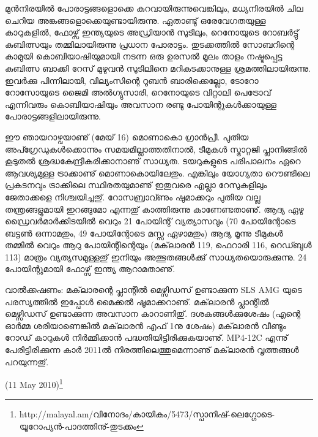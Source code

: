 മുന്‍നിരയില്‍ പോരാട്ടങ്ങളൊക്കെ കുറവായിരുന്നുവെങ്കിലും, മധ്യനിരയില്‍ ചില ചെറിയ അങ്കങ്ങളൊക്കെയുണ്ടായിരുന്നു.
ഏതാണ്ടു് ഒരേവേഗതയുള്ള കാറുകളില്‍, ഫോഴ്സ് ഇന്ത്യയുടെ അഡ്രിയാന്‍ സുടിലും, റെനോയുടെ റോബര്‍ട്ടു് കുബിത്സയും 
തമ്മിലായിരുന്നു പ്രധാന പോരാട്ടം. തുടക്കത്തില്‍ സോബറിന്റെ കാമുയി കൊബിയാഷിയുമായി നടന്ന ഒരു ഉരസല്‍ മൂലം 
താളം നഷ്ടപ്പെട്ട കുബിത്സ ബാക്കി റേസ് മുഴുവന്‍ സുടിലിനെ മറികടക്കാനുള്ള ശ്രമത്തിലായിരുന്നു. ഇവര്‍ക്കു പിന്നിലായി, 
വില്യംസിന്റെ റൂബന്‍ ബാരിക്കെല്ലോ, ടോറോ റോസോയുടെ ജൈമി അല്‍ഗ്യുസാരി, റെനോയുടെ വിറ്റാലി പെട്രോവ് 
എന്നിവരും കൊബിയാഷിയും അവസാന രണ്ടു പോയിന്റുകള്‍ക്കായുള്ള പോരാട്ടങ്ങളിലായിരുന്നു.

ഈ ഞായറാഴ്വയാണു് (മേയ് 16) മൊണാകൊ ഗ്രാന്‍പ്രീ. പുതിയ അപ്ഗ്രേഡുകള്‍ക്കൊന്നും സമയമില്ലാത്തതിനാല്‍, 
ടീമുകള്‍ സ്ട്രാറ്റജി പ്ലാനിങ്ങില്‍ കൂടുതല്‍ ശ്രദ്ധകേന്ദ്രീകരിക്കാനാണു് സാധ്യത. ടയറുകളുടെ പരിപാലനം ഏറെ ആവശ്യമുള്ള 
ട്രാക്കാണു് മൊണാകൊയിലേതും. എങ്കിലും യോഗ്യതാ റൌണ്ടിലെ പ്രകടനവും ട്രാക്കിലെ സ്ഥിരതയുമാണു് ഇതുവരെ 
എല്ലാ റേസുകളിലും ജേതാക്കളെ നിശ്ചയിച്ചതു്. റോസബ്രാവ്ണും ഷുമാക്കറും പുതിയ വല്ല തന്ത്രങ്ങളുമായി ഇറങ്ങുമോ
എന്നതു് കാത്തിരുന്നു കാണേണ്ടതാണു്. ആദ്യ ഏഴു ഡ്രൈവര്‍മാര്‍ക്കിടയില്‍ വെറും 21 പോയിന്റ് വ്യത്യാസവും 
(70 പോയിന്റോടെ ബട്ടണ്‍ ഒന്നാമതും, 49 പോയിന്റോടെ മസ്സ ഏഴാമതും) ആദ്യ മൂന്നു ടീമുകള്‍ തമ്മില്‍ വെറും ആറു 
പോയിന്റിന്റെയും (മക്‌ലാരന്‍ 119, ഫെറാരി 116, റെഡ്ബുള്‍ 113) മാത്രം വ്യത്യസമുള്ളതു് ഇനിയും അത്ഭുതങ്ങള്‍ക്കു് 
സാധ്യതയൊരുക്കുന്നു. 24 പോയിന്റുമായി ഫോഴ്സ് ഇന്ത്യ ആറാമതാണു്.

വാല്‍ക്കഷണം: മക്‌ലാരന്റെ പ്ലാന്റില്‍ മെഴ്സിഡസ് ഉണ്ടാക്കുന്ന SLS AMG യുടെ പരസ്യത്തില്‍ ഇപ്പോള്‍ മൈക്കല്‍ 
ഷൂമാക്കറാണു്. മക്‌ലാരന്‍ പ്ലാന്റില്‍ മെഴ്സിഡസ് ഉണ്ടാക്കുന്ന അവസാന കാറാണിതു്. ദശകങ്ങള്‍ക്കുശേഷം (എന്റെ 
ഓര്‍മ്മ ശരിയാണെങ്കില്‍ മക്‌ലാരന്‍ എഫ് 1നു ശേഷം) മക്‌ലാരന്‍ വീണ്ടും റോഡ് കാറുകള്‍ നിര്‍മ്മിക്കാന്‍ 
പദ്ധതിയിട്ടിരിക്കുകയാണു്. MP4-12C എന്നു് പേരിട്ടിരിക്കുന്ന കാര്‍ 2011ല്‍ നിരത്തിലെത്തുമെന്നാണു് മക്‌ലാരന്‍ 
വൃത്തങ്ങള്‍ പറയുന്നതു്.

(11 May 2010)\footnote{http://malayal.am/വിനോദം/കായികം/5473/സ്പാനിഷ്-ലെഗ്ഗോടെ-യൂറോപ്യന്‍-പാദത്തിനു്-തുടക്കം}

\newpage
